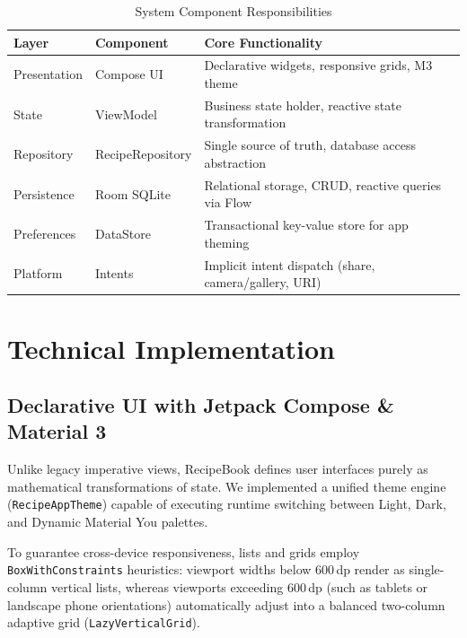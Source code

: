 \documentclass[sigconf]{acmart}
\begin{document}
\begin{table}[h]
\centering
\small
\caption{System Component Responsibilities}
\label{tab:arch}
\begin{tabular}{@{}llp{4.2cm}@{}}
\toprule
\textbf{Layer} & \textbf{Component} & \textbf{Core Functionality} \\
\midrule
Presentation & Compose UI & Declarative widgets, responsive grids, M3 theme \\
State & ViewModel & Business state holder, reactive state transformation \\
Repository & RecipeRepository & Single source of truth, database access abstraction \\
Persistence & Room SQLite & Relational storage, CRUD, reactive queries via Flow \\
Preferences & DataStore & Transactional key-value store for app theming \\
Platform & Intents & Implicit intent dispatch (share, camera/gallery, URI) \\
\bottomrule
\end{tabular}
\end{table}

\section{Technical Implementation}

\subsection{Declarative UI with Jetpack Compose \& Material 3}
Unlike legacy imperative views, RecipeBook defines user interfaces purely as mathematical transformations of state. We implemented a unified theme engine (\texttt{RecipeAppTheme}) capable of executing runtime switching between Light, Dark, and Dynamic Material You palettes. 

To guarantee cross-device responsiveness, lists and grids employ \texttt{BoxWithConstraints} heuristics: viewport widths below 600\,dp render as single-column vertical lists, whereas viewports exceeding 600\,dp (such as tablets or landscape phone orientations) automatically adjust into a balanced two-column adaptive grid (\texttt{LazyVerticalGrid}).
\end{document}

